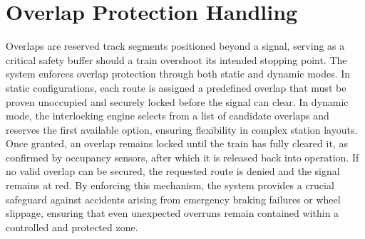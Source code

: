 \section{Overlap Protection Handling}
\label{sec:interlocking:overlap-protection}

Overlaps are reserved track segments positioned beyond a signal, serving as a critical safety buffer should a train overshoot its intended stopping point. The system enforces overlap protection through both static and dynamic modes. In static configurations, each route is assigned a predefined overlap that must be proven unoccupied and securely locked before the signal can clear. In dynamic mode, the interlocking engine selects from a list of candidate overlaps and reserves the first available option, ensuring flexibility in complex station layouts. Once granted, an overlap remains locked until the train has fully cleared it, as confirmed by occupancy sensors, after which it is released back into operation. If no valid overlap can be secured, the requested route is denied and the signal remains at red. By enforcing this mechanism, the system provides a crucial safeguard against accidents arising from emergency braking failures or wheel slippage, ensuring that even unexpected overruns remain contained within a controlled and protected zone.
